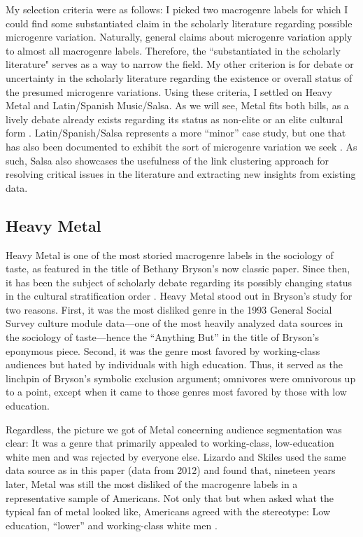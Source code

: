 \documentclass[a4paper,12pt]{extarticle}
\begin{document}
My selection criteria were as follows: I picked two macrogenre labels for which I could find some substantiated claim in the scholarly literature regarding possible microgenre variation. Naturally, general claims about microgenre variation apply to almost all macrogenre labels. Therefore, the ``substantiated in the scholarly literature" serves as a way to narrow the field. My other criterion is for debate or uncertainty in the scholarly literature regarding the existence or overall status of the presumed microgenre variations. Using these criteria, I settled on Heavy Metal and Latin/Spanish Music/Salsa. As we will see, Metal fits both bills, as a lively debate already exists regarding its status as non-elite or an elite cultural form \citep{tampubolon2008revisiting}. Latin/Spanish/Salsa represents a more ``minor'' case study, but one that has also been documented to exhibit the sort of microgenre variation we seek \citep{Bachmayer2014-pk}. As such, Salsa also showcases the usefulness of the link clustering approach for resolving critical issues in the literature and extracting new insights from existing data.

\subsection{Heavy Metal}
Heavy Metal is one of the most storied macrogenre labels in the sociology of taste, as featured in the title of Bethany Bryson's \citeyearpar{bryson96} now classic paper. Since then, it has been the subject of scholarly debate regarding its possibly changing status in the cultural stratification order \citep{tampubolon2008revisiting, goldberg2011mapping, lizardo_skiles15}. Heavy Metal stood out in Bryson's study for two reasons. First, it was the most disliked genre in the 1993 General Social Survey culture module data---one of the most heavily analyzed data sources in the sociology of taste---hence the ``Anything But'' in the title of Bryson's eponymous piece. Second, it was the genre most favored by working-class audiences but hated by individuals with high education. Thus, it served as the linchpin of Bryson's symbolic exclusion argument; omnivores were omnivorous up to a point, except when it came to those genres most favored by those with low education. 

Regardless, the picture we got of Metal concerning audience segmentation was clear: It was a genre that primarily appealed to working-class, low-education white men and was rejected by everyone else. Lizardo and Skiles \citeyearpar[][6, table 2]{lizardo_skiles16} used the same data source as in this paper (data from 2012) and found that, nineteen years later, Metal was still the most disliked of the macrogenre labels in a representative sample of Americans. Not only that but when asked what the typical fan of metal looked like, Americans agreed with the stereotype: Low education, ``lower'' and working-class white men \citep[][7, table 3]{lizardo_skiles16}. 
\end{document}
